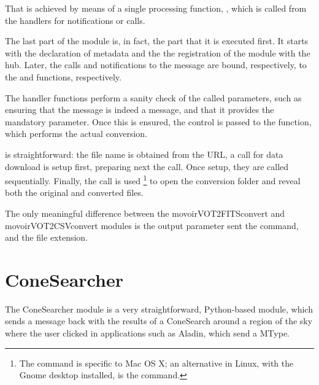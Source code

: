 			That is achieved by means of a single processing function,
			, which is called
			from the handlers for notifications or calls.
			
			The last part of the  module
			is, in fact, the part that it is executed first. It starts
			with the declaration of metadata and the the registration
			of the module with the hub. Later, the calls and
			notifications to the
			 message are bound,
			respectively, to the   and
			 functions, respectively.
			
			The handler functions perform a sanity check of the called
			parameters, such as ensuring that the message is indeed a
			 message, and that it provides
			the mandatory  parameter. Once this is
			ensured, the control is passed to the
			 function, which performs
			the actual conversion.
			
			 is straightforward:
			the
			file name is obtained from the URL, a  call
			for data download is setup first, preparing next the
			 call. Once setup, they are called 
			sequentially. Finally, the  call is used
			\footnote{The  command is specific to Mac OS
			X; an alternative in Linux, with the Gnome desktop
			installed, is the
			 command.} to open the conversion
			folder and reveal both the original and converted files.
			
			The only meaningful difference between the
			movoirVOT2FITSconvert and movoirVOT2CSVconvert modules
			is the output parameter sent the  command,
			and the file extension.
					
	
	
	\section{ConeSearcher} %
	\label{sec:amiga_conesearch}
		
		The ConeSearcher module is a very straightforward,
		Python-based module, which sends a 
		message back with the results of a ConeSearch around a region
		of the sky where the user clicked in applications
		such as Aladin, which send a 
		MType.
		
